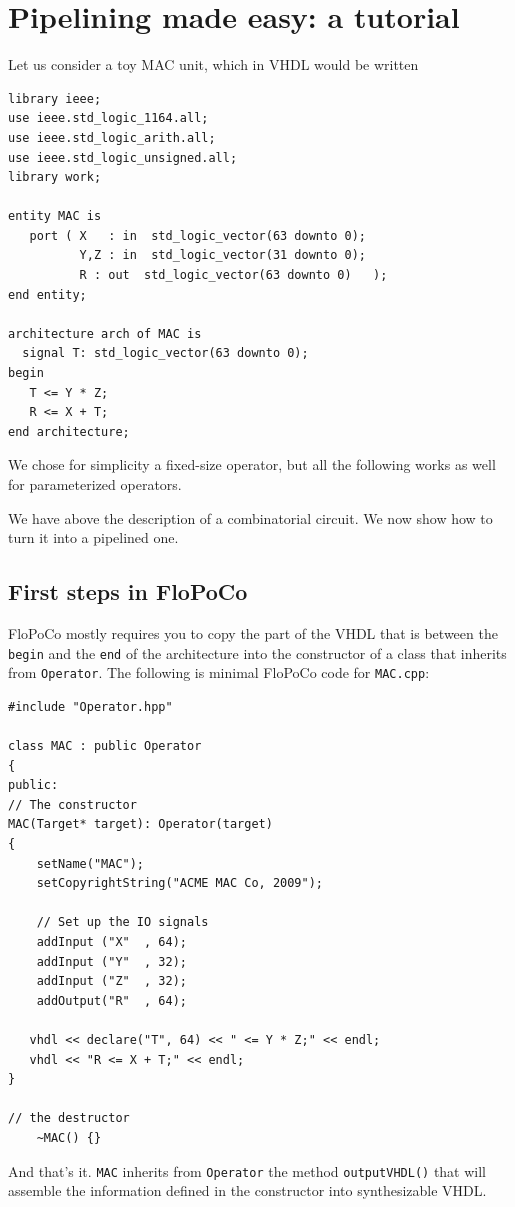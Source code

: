 \documentclass{article}
\begin{document}
\section{Pipelining made easy: a tutorial}
\label{sec:pme}

Let us consider a toy MAC unit, which in VHDL would be written
\begin{verbatim}
library ieee;
use ieee.std_logic_1164.all;
use ieee.std_logic_arith.all;
use ieee.std_logic_unsigned.all;
library work;

entity MAC is
   port ( X   : in  std_logic_vector(63 downto 0);
          Y,Z : in  std_logic_vector(31 downto 0);
          R : out  std_logic_vector(63 downto 0)   );
end entity;

architecture arch of MAC is
  signal T: std_logic_vector(63 downto 0);
begin
   T <= Y * Z;
   R <= X + T;
end architecture;
\end{verbatim}
We chose for simplicity a fixed-size operator, but all the following
works as well for parameterized operators.

We have above  the description of
a combinatorial circuit. We now show how to turn it into a pipelined
one.


\subsection{First steps in FloPoCo}

FloPoCo mostly requires you to copy the part of the VHDL that is
between the \texttt{begin} and the \texttt{end} of the architecture
into the constructor of a class that inherits from
\verb!Operator!. The following is minimal FloPoCo code for
\verb!MAC.cpp!:
\begin{verbatim}
#include "Operator.hpp"

class MAC : public Operator
{
public:
// The constructor
MAC(Target* target): Operator(target)
{
	setName("MAC");
	setCopyrightString("ACME MAC Co, 2009");		

	// Set up the IO signals
	addInput ("X"  , 64);
	addInput ("Y"  , 32);
	addInput ("Z"  , 32);
	addOutput("R"  , 64);

   vhdl << declare("T", 64) << " <= Y * Z;" << endl;
   vhdl << "R <= X + T;" << endl;
}

// the destructor
	~MAC() {}
\end{verbatim}
 
And that's it. \verb!MAC! inherits from \verb!Operator! the method
\verb!outputVHDL()! that will assemble the information defined in the
constructor into synthesizable VHDL.
\end{document}
